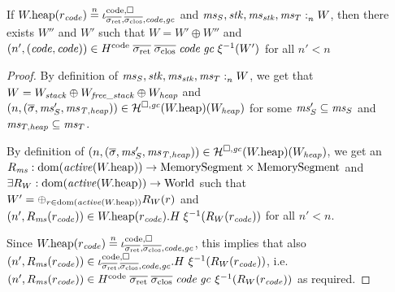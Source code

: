 \documentclass[a4paper]{article}
\begin{document}
\begin{lemma}
  \label{lem:code-reg-and-mem-sat}
  If $\pwheap(r_\code) \nequal \codereg{\sigrets,\sigcloss,\code,\gc}$ and
  $\memSat{\ms_S,\stk,\ms_\stk,\ms_T}{W}$, then there exists $W''$
  and $W'$ such that $W = W' \oplus W''$ and
  $\npair[n']{(\code,\code)} \in H^\mathrm{code} \; \sigrets \; \sigcloss \; \code \; \gc \; \xi^{-1}(W')$ for all $n' < n$
\end{lemma}
\begin{proof}
  By definition of $\memSat{\ms_S,\stk,\ms_\stk,\ms_T}{W}$, we get that $W = W_{\var{stack}} \oplus W_{\var{free\_stack}} \oplus W_{\var{heap}}$ and
  $\npair{(\overline{\sigma},\ms_S',\ms_\var{T,heap})} \in
  \lrheap(\pwheap)(W_{\var{heap}})$ for some $\ms_S' \subseteq \ms_S$ and $\ms_{T,\var{heap}}\subseteq \ms_T$.

  By definition of $\npair{(\overline{\sigma},\ms_S',\ms_\var{T,heap})} \in
  \lrheap(\pwheap)(W_{\var{heap}})$, we get an
  $R_\ms : \dom(\activeReg{\pwheap}) \fun \MemSeg \times \MemSeg$ and $\exists R_W : \dom(\activeReg{\pwheap}) \fun \World$ such that $W' = \oplus_{r \in \dom(\activeReg{\pwheap})} R_W(r)$ and $\npair[n']{R_\ms(r_{\var{code}})} \in  \pwheap(r_{\var{code}}).H \; \xi^{-1}(R_W(r_{\var{code}}))$ for all $n' < n$.

  Since $\pwheap(r_\code) \nequal \codereg{\sigrets,\sigcloss,\code,\gc}$, this implies that also $\npair[n']{R_\ms(r_{\var{code}})} \in  \codereg{\sigrets,\sigcloss,\code,\gc}.H~ \xi^{-1}(R_W(r_{\var{code}}))$, i.e. $\npair[n']{R_\ms(r_{\var{code}})} \in  H^\mathrm{code} \; \sigrets \; \sigcloss \; \code \; \gc~ \xi^{-1}(R_W(r_{\var{code}}))$ as required.
\end{proof}
\end{document}
